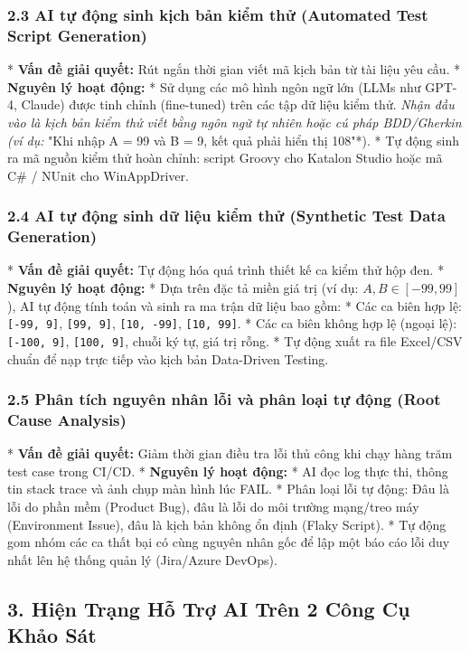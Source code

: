 \subsubsection{2.3 AI tự động sinh kịch bản kiểm thử (Automated Test Script Generation)}
* \textbf{Vấn đề giải quyết:} Rút ngắn thời gian viết mã kịch bản từ tài liệu yêu cầu.
* \textbf{Nguyên lý hoạt động:}
  * Sử dụng các mô hình ngôn ngữ lớn (LLMs như GPT-4, Claude) được tinh chỉnh (fine-tuned) trên các tập dữ liệu kiểm thử.
  \textit{ Nhận đầu vào là kịch bản kiểm thử viết bằng ngôn ngữ tự nhiên hoặc cú pháp BDD/Gherkin (ví dụ: }"Khi nhập A = 99 và B = 9, kết quả phải hiển thị 108"*).
  * Tự động sinh ra mã nguồn kiểm thử hoàn chỉnh: script Groovy cho Katalon Studio hoặc mã C# / NUnit cho WinAppDriver.

\subsubsection{2.4 AI tự động sinh dữ liệu kiểm thử (Synthetic Test Data Generation)}
* \textbf{Vấn đề giải quyết:} Tự động hóa quá trình thiết kế ca kiểm thử hộp đen.
* \textbf{Nguyên lý hoạt động:}
  * Dựa trên đặc tả miền giá trị (ví dụ: $A, B \in [-99, 99]$), AI tự động tính toán và sinh ra ma trận dữ liệu bao gồm:
    * Các ca biên hợp lệ: \texttt{[-99, 9]}, \texttt{[99, 9]}, \texttt{[10, -99]}, \texttt{[10, 99]}.
    * Các ca biên không hợp lệ (ngoại lệ): \texttt{[-100, 9]}, \texttt{[100, 9]}, chuỗi ký tự, giá trị rỗng.
  * Tự động xuất ra file Excel/CSV chuẩn để nạp trực tiếp vào kịch bản Data-Driven Testing.

\subsubsection{2.5 Phân tích nguyên nhân lỗi và phân loại tự động (Root Cause Analysis)}
* \textbf{Vấn đề giải quyết:} Giảm thời gian điều tra lỗi thủ công khi chạy hàng trăm test case trong CI/CD.
* \textbf{Nguyên lý hoạt động:}
  * AI đọc log thực thi, thông tin stack trace và ảnh chụp màn hình lúc FAIL.
  * Phân loại lỗi tự động: Đâu là lỗi do phần mềm (Product Bug), đâu là lỗi do môi trường mạng/treo máy (Environment Issue), đâu là kịch bản không ổn định (Flaky Script).
  * Tự động gom nhóm các ca thất bại có cùng nguyên nhân gốc để lập một báo cáo lỗi duy nhất lên hệ thống quản lý (Jira/Azure DevOps).


\subsection{3. Hiện Trạng Hỗ Trợ AI Trên 2 Công Cụ Khảo Sát}

